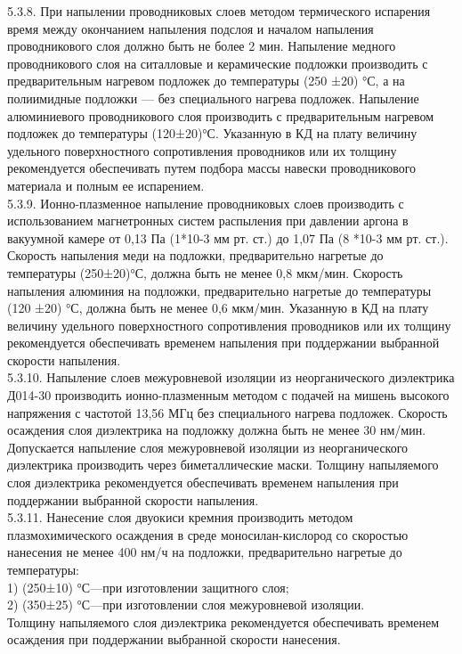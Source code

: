 \documentclass{bmstu}
\begin{document}
	5.3.8. При напылении проводниковых слоев методом термического испарения время между окончанием напыления подслоя и началом напыления проводникового слоя должно быть не более 2 мин. Напыление медного проводникового слоя на ситалловые и керамические подложки производить с предварительным нагревом подложек до температуры (250 ±20) °С, а на полиимидные подложки — без специального нагрева подложек. Напыление алюминиевого проводникового слоя производить с предварительным нагревом подложек до температуры (120±20)°С. Указанную в КД на плату величину удельного поверхностного сопротивления проводников или их толщину рекомендуется обеспечивать путем подбора массы навески проводникового материала и полным ее испарением. \\
	5.3.9. Ионно-плазменное напыление проводниковых слоев производить с использованием магнетронных систем распыления при давлении аргона в вакуумной камере от 0,13 Па  (1*10-3  мм рт. ст.) до 1,07 Па (8 *10-3 мм рт. ст.). Скорость напыления меди на подложки, предварительно нагретые до температуры (250±20)°С, должна быть не менее 0,8 мкм/мин. Скорость напыления алюминия на подложки, предварительно нагретые до температуры (120 ±20) °С, должна быть не менее 0,6 мкм/мин. Указанную в КД на плату величину удельного поверхностного сопротивления проводников или их толщину рекомендуется обеспечивать временем напыления при поддержании выбранной скорости напыления. \\
	5.3.10. Напыление слоев межуровневой изоляции из неорганического диэлектрика Д014-30 производить ионно-плазменным методом с подачей на мишень высокого напряжения с частотой 13,56 МГц без специального нагрева подложек. Скорость осаждения слоя диэлектрика на подложку должна быть не менее 30 нм/мин. Допускается напыление слоя межуровневой изоляции из неорганического диэлектрика производить через биметаллические маски. Толщину напыляемого слоя диэлектрика рекомендуется обеспечивать временем напыления при поддержании выбранной скорости напыления. \\
	5.3.11. Нанесение слоя двуокиси кремния производить методом плазмохимического осаждения в среде моносилан-кислород со скоростью нанесения не менее 400 нм/ч на подложки, предварительно нагретые до температуры: \\
	1)  (250±10) °С—при изготовлении защитного слоя; \\
	2)  (350±25) °С—при изготовлении слоя межуровневой изоляции. \\
	Толщину напыляемого слоя диэлектрика рекомендуется обеспечивать временем осаждения при поддержании выбранной скорости нанесения. \\
\end{document}

